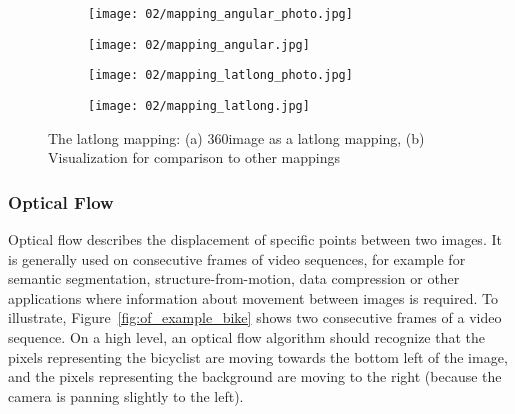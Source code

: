 \begin{figure}
    \quad
    \begin{subfigure}[b]{0.5\textwidth}            
            \centering
            \texttt{[image: 02/mapping\_angular\_photo.jpg]}
            \caption{}
    \end{subfigure}%
    \begin{subfigure}[b]{0.5\textwidth}
            \centering
            \texttt{[image: 02/mapping\_angular.jpg]}
            \caption{}
    \end{subfigure}
    \caption[Angular mapping]{The angular mapping: (a) 360\degree image as an angular mapping, (b) Visualization for comparison to other mappings}\label{fig:angular-intro}

    \quad
    \begin{subfigure}[b]{0.5\textwidth}            
            \centering
            \texttt{[image: 02/mapping\_latlong\_photo.jpg]}
            \caption{}
    \end{subfigure}%
    \begin{subfigure}[b]{0.5\textwidth}
            \centering
            \texttt{[image: 02/mapping\_latlong.jpg]}
            \caption{}
    \end{subfigure}
    \caption[Latlong mapping]{The latlong mapping: (a) 360\degree image as a latlong mapping, (b) Visualization for comparison to other mappings}\label{fig:latlong-intro}
  \end{figure}


\subsubsection{Optical Flow}

Optical flow describes the displacement of specific points between two images. It is generally used on consecutive frames of video sequences, for example for semantic segmentation, structure-from-motion, data compression or other applications where information about movement between images is required. To illustrate, Figure~\ref{fig:of_example_bike} shows two consecutive frames of a video sequence. On a high level, an optical flow algorithm should recognize that the pixels representing the bicyclist are moving towards the bottom left of the image, and the pixels representing the background are moving to the right (because the camera is panning slightly to the left).

